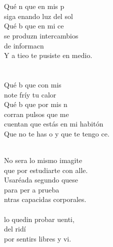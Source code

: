 \begin{cancion}%
\jump\\
	    \chord{(}{**)}{    }\\
	Qué n que en mis p \\
	siga enando luz del sol\\
	Qué b que en mi ce\\
	se produzn intercambios \\
	de informacn\\
	Y a tieo te pusiste en medio.\\
\jump\\
	   \chord{(}{**)}{    }\\
	Qué b que con mis \\
	note fríy tu calor \\
	Qué b que por mis n \\
	corran pulsos que me\\
	cuentan que estás en mi habitón\\
	Que no te has o y que te tengo ce.\\\jump\\
	\begin{chorus}%
	No sera lo mismo imagite\\
	que por estudiarte con alle.\\
	Usaréada segundo quese\\
	para per a prueba \\
	ntras capacidas corporales.\\
\jump\\
	lo quedin probar uenti,\\
	del ridí\\
	por sentirs libres y vi.\\
	\end{chorus}%
	\jump\\

\end{cancion}
